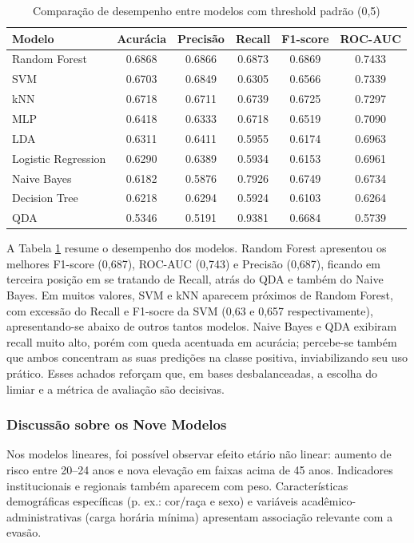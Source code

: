 \documentclass[english, spanish, brazilian]{RBIEarticle} %
\begin{document}
\begin{table}[H]
    \centering
    \caption{Comparação de desempenho entre modelos com threshold padrão (0,5)}
    \label{tab:comparacao-global}
    \begin{tabular}{lccccc}
        \toprule
        Modelo & Acurácia & Precisão & Recall & F1-score & ROC-AUC \\
        \midrule
        Random Forest & 0.6868 & 0.6866 & 0.6873 & 0.6869 & 0.7433 \\
        SVM & 0.6703 & 0.6849 & 0.6305 & 0.6566 & 0.7339 \\
        kNN & 0.6718 & 0.6711 & 0.6739 & 0.6725 & 0.7297 \\
        MLP & 0.6418 & 0.6333 & 0.6718 & 0.6519 & 0.7090 \\
        LDA & 0.6311 & 0.6411 & 0.5955 & 0.6174 & 0.6963 \\
        Logistic Regression & 0.6290 & 0.6389 & 0.5934 & 0.6153 & 0.6961 \\
        Naive Bayes & 0.6182 & 0.5876 & 0.7926 & 0.6749 & 0.6734 \\
        Decision Tree & 0.6218 & 0.6294 & 0.5924 & 0.6103 & 0.6264 \\
        QDA & 0.5346 & 0.5191 & 0.9381 & 0.6684 & 0.5739 \\
        \bottomrule
    \end{tabular}
\end{table}

A Tabela \ref{tab:comparacao-global} resume o desempenho dos modelos. Random Forest apresentou os melhores F1-score (0,687), ROC-AUC (0,743) e Precisão (0,687), ficando em terceira posição em se tratando de Recall, atrás do QDA e também do Naive Bayes. Em muitos valores, SVM e kNN aparecem próximos de Random Forest, com excessão do Recall e F1-socre da SVM (0,63 e 0,657 respectivamente), apresentando-se abaixo de outros tantos modelos. Naive Bayes e QDA exibiram recall muito alto, porém com queda acentuada em acurácia; percebe-se também que ambos concentram as suas predições na classe positiva, inviabilizando seu uso prático. Esses achados reforçam que, em bases desbalanceadas, a escolha do limiar e a métrica de avaliação são decisivas.

\subsubsection{Discussão sobre os Nove Modelos}
Nos modelos lineares, foi possível observar efeito etário não linear: aumento de risco entre 20–24 anos e nova elevação em faixas acima de 45 anos. Indicadores institucionais e regionais também aparecem com peso. Características demográficas específicas (p. ex.: cor/raça e sexo) e variáveis acadêmico-administrativas (carga horária mínima) apresentam associação relevante com a evasão.
\end{document}
